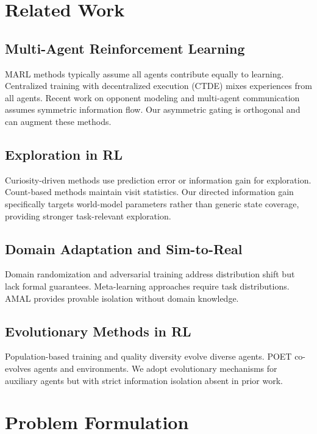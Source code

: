 \documentclass[12pt, a4paper]{article}
\begin{document}
\section{Related Work}

\subsection{Multi-Agent Reinforcement Learning}
MARL methods typically assume all agents contribute equally to learning. Centralized training with decentralized execution (CTDE) \cite{oliehoek2016concise} mixes experiences from all agents. Recent work on opponent modeling \cite{he2016opponent} and multi-agent communication \cite{foerster2016learning} assumes symmetric information flow. Our asymmetric gating is orthogonal and can augment these methods.

\subsection{Exploration in RL}
Curiosity-driven methods \cite{pathak2017curiosity,burda2019exploration} use prediction error or information gain for exploration. Count-based methods \cite{bellemare2016unifying} maintain visit statistics. Our directed information gain specifically targets world-model parameters rather than generic state coverage, providing stronger task-relevant exploration.

\subsection{Domain Adaptation and Sim-to-Real}
Domain randomization \cite{tobin2017domain} and adversarial training \cite{pinto2017robust} address distribution shift but lack formal guarantees. Meta-learning approaches \cite{finn2017model} require task distributions. AMAL provides provable isolation without domain knowledge.

\subsection{Evolutionary Methods in RL}
Population-based training \cite{jaderberg2017population} and quality diversity \cite{pugh2016quality} evolve diverse agents. POET \cite{wang2019paired} co-evolves agents and environments. We adopt evolutionary mechanisms for auxiliary agents but with strict information isolation absent in prior work.

\section{Problem Formulation}
\end{document}
